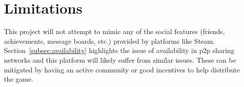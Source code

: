 
\section{Limitations}

This project will not attempt to mimic any of the social features (friends, achievements, message boards, etc.) provided by platforms like Steam.
\x
Section~\ref{subsec:availability} highlights the issue of availability in p2p sharing networks and this platform will likely suffer from similar issues. These can be mitigated by having an active community or good incentives to help distribute the game.